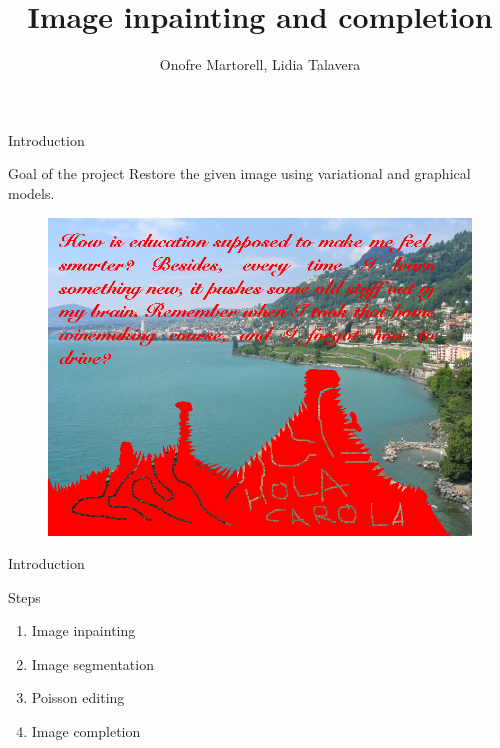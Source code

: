 \documentclass[11pt]{beamer}
\author{Onofre Martorell, Lidia Talavera}
\title{Image inpainting and completion}
\begin{document}
\begin{frame}
\titlepage
\end{frame}


\begin{frame}{Introduction}
\begin{block}{Goal of the project}
Restore the given image using variational and graphical models.
\end{block}

\begin{figure}
\begin{center}
\includegraphics[scale=0.6]{Goal_image}
\end{center}
\end{figure}
\end{frame}

\begin{frame}{Introduction}
\begin{block}{Steps}
\begin{enumerate}
\item Image inpainting
\item Image segmentation
\item Poisson editing
\item Image completion
\end{enumerate}
\end{block}
\end{frame}
\end{document}
